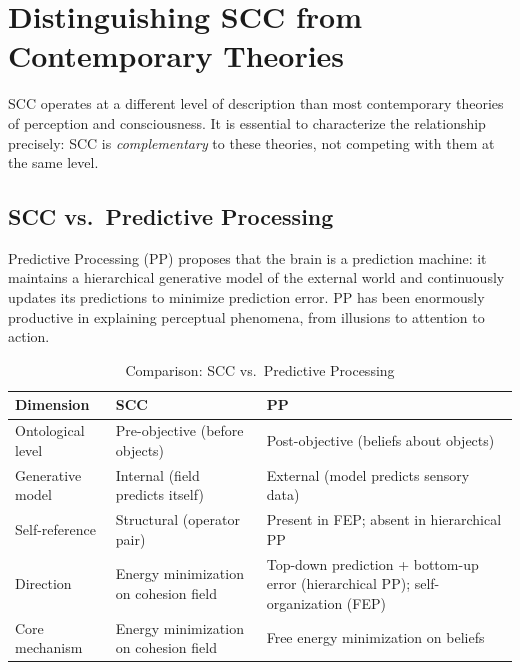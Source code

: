 \documentclass[lettersize,journal]{IEEEtran}
\begin{document}
\section{Distinguishing SCC from Contemporary Theories}

SCC operates at a different level of description than most contemporary theories of perception and consciousness. It is essential to characterize the relationship precisely: SCC is \emph{complementary} to these theories, not competing with them at the same level.

\subsection{SCC vs.\ Predictive Processing}

Predictive Processing (PP) \cite{clark2013whatever,friston2010free,hohwy2013predictive} proposes that the brain is a prediction machine: it maintains a hierarchical generative model of the external world and continuously updates its predictions to minimize prediction error. PP has been enormously productive in explaining perceptual phenomena, from illusions to attention to action.

\begin{table}[!t]
\centering
\caption{Comparison: SCC vs.\ Predictive Processing}
\label{tab:pp}
\begin{tabular}{p{2.2cm}p{2.8cm}p{2.5cm}}
\toprule
\textbf{Dimension} & \textbf{SCC} & \textbf{PP} \\
\midrule
Ontological level & Pre-objective (before objects) & Post-objective (beliefs about objects) \\
\addlinespace
Generative model & Internal (field predicts itself) & External (model predicts sensory data) \\
\addlinespace
Self-reference & Structural (operator pair) & Present in FEP; absent in hierarchical PP \\
\addlinespace
Direction & Energy minimization on cohesion field & Top-down prediction + bottom-up error (hierarchical PP); self-organization (FEP) \\
\addlinespace
Core mechanism & Energy minimization on cohesion field & Free energy minimization on beliefs \\
\bottomrule
\end{tabular}
\end{table}
\end{document}
